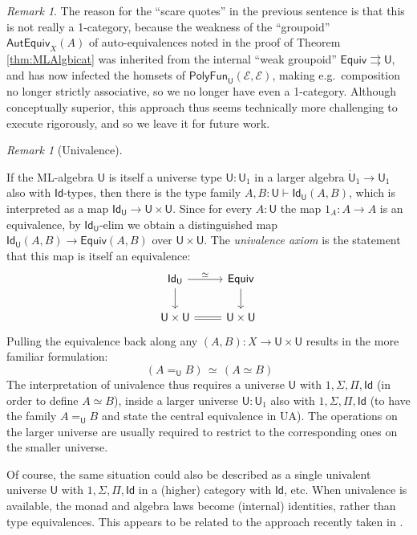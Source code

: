 \documentclass[12pt,reqno]{amsart}
\newcommand{\EE}{\ensuremath{\mathcal{E}}}
\renewcommand{\to}{\ensuremath{\rightarrow}}
\newcommand{\tto}{\ensuremath{\rightrightarrows}}
\newcommand{\Id}{\mathsf{Id}}
\newcommand{\T}{\ensuremath{\mathsf{U}}}
\newcommand{\TT}{\ensuremath{\dot{\mathsf{U}}}}
\theoremstyle{remark}
\newtheorem{remark}[theorem]{Remark}
\theoremstyle{definition}
\begin{document}
\begin{remark}
The reason for the ``scare quotes'' in the previous sentence is that this is not really a 1-category, because the weakness of the ``groupoid'' $\mathsf{AutEquiv}_X(A)$ of auto-equivalences noted in the proof of Theorem \ref{thm:MLAlgbicat} was inherited from the internal ``weak groupoid''  $\mathsf{Equiv} \tto \T$, and has now infected the homsets of $\mathsf{PolyFun}_\T(\EE, \EE)$, making e.g.\ composition no longer strictly associative, so we no longer have even a 1-category.  Although conceptually superior, this approach thus seems technically more challenging to execute rigorously, and so we leave it for future work.
\end{remark}

\begin{remark}[Univalence]\label{remark:univalence}

If the ML-algebra $\T$ is itself a universe type $\T : \T_1$ in a larger algebra $\TT_1 \to \T_1$ also with $\Id{}$-types, then there is the type family $A, B: \T \vdash \Id_{\T}(A,B)$, which is interpreted as a map $\Id_{\T}\to \T \times \T$.  Since for every $A:\T$ the map $1_A : A \to A$ is an equivalence, by $\Id_{\T}$-elim we obtain a distinguished map  $\Id_{\T}(A, B) \to \mathsf{Equiv}(A, B)$ over $\T \times \T$.  The \emph{univalence axiom} is the statement that this map is itself an equivalence:
\begin{equation}\label{diag:univalence4}
\begin{tikzcd} 
\Id_{\T} \ar[d] \ar[r, "{\simeq}"] & \mathsf{Equiv} \ar[d] \\  
 \T \times \T  \ar[r, equals] & \T \times \T
	 \end{tikzcd}
 \end{equation}
 Pulling the equivalence back along any $(A, B) : X \to \T \times \T$ results in the more familiar formulation:
 \[\tag{UA}
 \ (A =_\T B) \, \simeq\, (A \simeq B)
 \]
The interpretation of univalence thus requires a universe $\T$ with $1, \Sigma, \Pi, \Id{}$ (in order to define $A\simeq B$), inside a larger universe $\T:\T_1$ also with $1, \Sigma, \Pi, \Id{}$ (to have the family $A =_\T B$ and state the central equivalence in UA). The operations on the larger universe are usually required to restrict to the corresponding ones on the smaller universe.   

Of course, the same situation could also be described as a single univalent universe $\T$ with $1, \Sigma, \Pi, \Id{}$ in a (higher) category with $\Id{}$, etc.  When univalence is available, the monad and algebra laws become (internal) identities, rather than type equivalences.  This appears to be related to the approach recently taken in \cite{AberleSpivak:2024}.
\end{remark}
\end{document}
